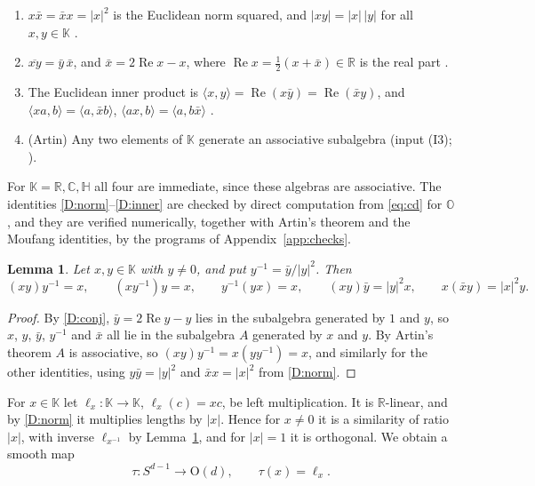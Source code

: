 \documentclass[11pt]{amsart}
\numberwithin{equation}{section}
\theoremstyle{plain}
\newtheorem{lemma}[theorem]{Lemma}
\theoremstyle{definition}
\theoremstyle{remark}
\newcommand{\R}{\mathbb{R}}
\newcommand{\C}{\mathbb{C}}
\newcommand{\Hq}{\mathbb{H}}
\newcommand{\Oc}{\mathbb{O}}
\newcommand{\K}{\mathbb{K}}
\renewcommand{\Re}{\operatorname{Re}}
\begin{document}
\begin{enumerate}[label=(D\arabic*)]
\item\label{D:norm} $x\bar x=\bar x x=|x|^2$ is the Euclidean norm squared, and $|xy|=|x|\,|y|$ for all $x,y\in\K$ \cite[Section~2.2]{Bae02}.
\item\label{D:conj} $\overline{xy}=\bar y\,\bar x$, and $\bar x=2\Re x-x$, where $\Re x=\tfrac12(x+\bar x)\in\R$ is the real part \cite[Section~2.2]{Bae02}.
\item\label{D:inner} The Euclidean inner product is $\langle x,y\rangle=\Re(x\bar y)=\Re(\bar x y)$, and $\langle xa,b\rangle=\langle a,\bar x b\rangle$, $\langle ax,b\rangle=\langle a,b\bar x\rangle$ \cite[Chapter~III]{Sch66}.
\item\label{D:artin} (Artin) Any two elements of $\K$ generate an associative subalgebra (input (I3); \cite[Theorem~3.1]{Sch66}).
\end{enumerate}
For $\K=\R,\C,\Hq$ all four are immediate, since these algebras are associative. The identities \ref{D:norm}--\ref{D:inner} are checked by direct computation from \eqref{eq:cd} for $\Oc$, and they are verified numerically, together with Artin's theorem and the Moufang identities, by the programs of Appendix~\ref{app:checks}.

\begin{lemma}\label{lem:artin}
Let $x,y\in\K$ with $y\neq0$, and put $y^{-1}=\bar y/|y|^2$. Then
\[
(xy)y^{-1}=x,\qquad (xy^{-1})y=x,\qquad y^{-1}(yx)=x,\qquad (xy)\bar y=|y|^2x,\qquad x(\bar x y)=|x|^2y .
\]
\end{lemma}

\begin{proof}
By \ref{D:conj}, $\bar y=2\Re y-y$ lies in the subalgebra generated by $1$ and $y$, so $x$, $y$, $\bar y$, $y^{-1}$ and $\bar x$ all lie in the subalgebra $A$ generated by $x$ and $y$. By Artin's theorem $A$ is associative, so $(xy)y^{-1}=x(yy^{-1})=x$, and similarly for the other identities, using $y\bar y=|y|^2$ and $\bar x x=|x|^2$ from \ref{D:norm}.
\end{proof}

For $x\in\K$ let $\ell_x\colon\K\to\K$, $\ell_x(c)=xc$, be left multiplication. It is $\R$-linear, and by \ref{D:norm} it multiplies lengths by $|x|$. Hence for $x\neq0$ it is a similarity of ratio $|x|$, with inverse $\ell_{x^{-1}}$ by Lemma~\ref{lem:artin}, and for $|x|=1$ it is orthogonal. We obtain a smooth map
\begin{equation}\label{eq:clutch}
\tau\colon S^{d-1}\to \mathrm{O}(d),\qquad \tau(x)=\ell_x .
\end{equation}
\end{document}
